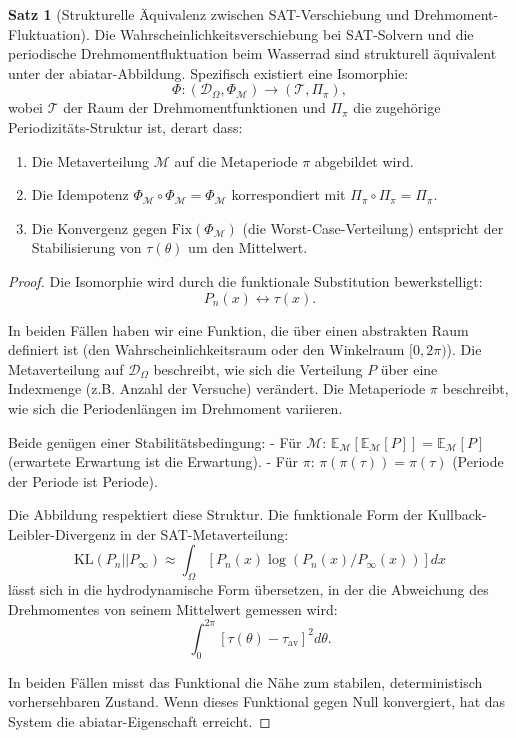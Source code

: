 \documentclass[a4paper,12pt]{article}
\theoremstyle{definition}
\newtheorem{satz}{Satz}
\begin{document}
\begin{satz}[Strukturelle Äquivalenz zwischen SAT-Verschiebung und Drehmoment-Fluktuation]
\label{satz:sat_vs_hydro}
Die Wahrscheinlichkeitsverschiebung bei SAT-Solvern und die periodische Drehmomentfluktuation beim Wasserrad sind strukturell äquivalent unter der abiatar-Abbildung. Spezifisch existiert eine Isomorphie:
\[
\Phi: (\mathcal{D}_\Omega, \Phi_\mathcal{M}) \to (\mathcal{T}, \Pi_\pi),
\]
wobei $\mathcal{T}$ der Raum der Drehmomentfunktionen und $\Pi_\pi$ die zugehörige Periodizitäts-Struktur ist, derart dass:
\begin{enumerate}
	\item Die Metaverteilung $\mathcal{M}$ auf die Metaperiode $\pi$ abgebildet wird.
	\item Die Idempotenz $\Phi_\mathcal{M} \circ \Phi_\mathcal{M} = \Phi_\mathcal{M}$ korrespondiert mit $\Pi_\pi \circ \Pi_\pi = \Pi_\pi$.
	\item Die Konvergenz gegen $\text{Fix}(\Phi_\mathcal{M})$ (die Worst-Case-Verteilung) entspricht der Stabilisierung von $\tau(\theta)$ um den Mittelwert.
\end{enumerate}
\end{satz}

\begin{proof}
Die Isomorphie wird durch die funktionale Substitution bewerkstelligt:
\[
P_n(x) \leftrightarrow \tau(x).
\]

In beiden Fällen haben wir eine Funktion, die über einen abstrakten Raum definiert ist (den Wahrscheinlichkeitsraum oder den Winkelraum $[0, 2\pi)$). Die Metaverteilung auf $\mathcal{D}_\Omega$ beschreibt, wie sich die Verteilung $P$ über eine Indexmenge (z.B. Anzahl der Versuche) verändert. Die Metaperiode $\pi$ beschreibt, wie sich die Periodenlängen im Drehmoment variieren.

Beide genügen einer Stabilitätsbedingung: 
- Für $\mathcal{M}$: $\mathbb{E}_\mathcal{M}[\mathbb{E}_\mathcal{M}[P]] = \mathbb{E}_\mathcal{M}[P]$ (erwartete Erwartung ist die Erwartung).
- Für $\pi$: $\pi(\pi(\tau)) = \pi(\tau)$ (Periode der Periode ist Periode).

Die Abbildung respektiert diese Struktur. Die funktionale Form der Kullback-Leibler-Divergenz in der SAT-Metaverteilung:
\[
\text{KL}(P_n || P_\infty) \approx \int_\Omega [P_n(x) \log(P_n(x) / P_\infty(x))] dx
\]
lässt sich in die hydrodynamische Form übersetzen, in der die Abweichung des Drehmomentes von seinem Mittelwert gemessen wird:
\[
\int_0^{2\pi} [\tau(\theta) - \tau_{\text{av}}]^2 d\theta.
\]

In beiden Fällen misst das Funktional die Nähe zum stabilen, deterministisch vorhersehbaren Zustand. Wenn dieses Funktional gegen Null konvergiert, hat das System die abiatar-Eigenschaft erreicht. 
\end{proof}
\end{document}

